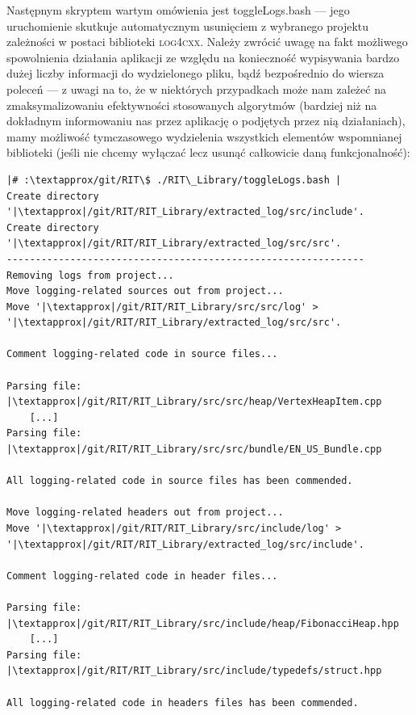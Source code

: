 Następnym skryptem wartym omówienia jest \textsf{toggleLogs.bash} --- jego uruchomienie skutkuje automatycznym usunięciem z wybranego projektu zależności w postaci biblioteki \textsc{log4cxx}. Należy zwrócić uwagę na fakt możliwego spowolnienia działania aplikacji ze względu na konieczność wypisywania bardzo dużej liczby informacji do wydzielonego pliku, bądź bezpośrednio do wiersza poleceń --- z uwagi na to, że w niektórych przypadkach może nam zależeć na zmaksymalizowaniu efektywności stosowanych algorytmów (bardziej niż na dokładnym informowaniu nas przez aplikację o podjętych przez nią działaniach), mamy możliwość tymczasowego wydzielenia wszystkich elementów wspomnianej biblioteki (jeśli nie chcemy wyłączać lecz usunąć całkowicie daną funkcjonalność):

\begin{verbatim}
|# :\textapprox/git/RIT\$ ./RIT\_Library/toggleLogs.bash |
Create directory '|\textapprox|/git/RIT/RIT_Library/extracted_log/src/include'.
Create directory '|\textapprox|/git/RIT/RIT_Library/extracted_log/src/src'.
--------------------------------------------------------------
Removing logs from project...
Move logging-related sources out from project...
Move '|\textapprox|/git/RIT/RIT_Library/src/src/log' > '|\textapprox|/git/RIT/RIT_Library/extracted_log/src/src'.

Comment logging-related code in source files...

Parsing file: |\textapprox|/git/RIT/RIT_Library/src/src/heap/VertexHeapItem.cpp
	[...]
Parsing file: |\textapprox|/git/RIT/RIT_Library/src/src/bundle/EN_US_Bundle.cpp

All logging-related code in source files has been commended.

Move logging-related headers out from project...
Move '|\textapprox|/git/RIT/RIT_Library/src/include/log' > '|\textapprox|/git/RIT/RIT_Library/extracted_log/src/include'.

Comment logging-related code in header files...

Parsing file: |\textapprox|/git/RIT/RIT_Library/src/include/heap/FibonacciHeap.hpp
	[...]
Parsing file: |\textapprox|/git/RIT/RIT_Library/src/include/typedefs/struct.hpp

All logging-related code in headers files has been commended.
\end{verbatim}

